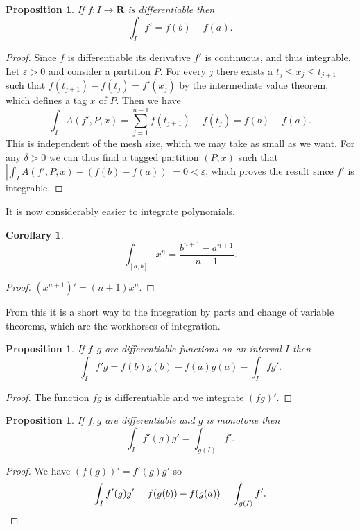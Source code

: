 \documentclass[11pt]{amsart}
\newtheorem{prop}[theo]{Proposition}
\newtheorem{coro}[theo]{Corollary}
\theoremstyle{definition}
\def\eps{\varepsilon}
\def\RR{\mathbf{R}}
\begin{document}
\begin{prop}
If $f : I \to \RR$ is differentiable then
\[
\int_I f' = f(b) - f(a).
\]
\end{prop}


\begin{proof}
Since $f$ is differentiable its derivative $f'$ is continuous, and thus integrable.
Let $\eps > 0$ and consider a partition $P$.
For every $j$ there exists a $t_j \leq x_j \leq t_{j+1}$ such that $f(t_{j+1}) - f(t_j) = f'(x_j)$ by the intermediate value theorem, which defines a tag $x$ of $P$.
Then we have
\[
\int_I A(f', P, x)
= \sum_{j=1}^{n-1} f(t_{j+1}) - f(t_j)
= f(b) - f(a).
\]
This is independent of the mesh size, which we may take as small as we want.
For any $\delta > 0$ we can thus find a tagged partition $(P,x)$ such that $|\int_I A(f',P,x) - (f(b) - f(a))| = 0 < \eps$, which proves the result since $f'$ is integrable.
\end{proof}


It is now considerably easier to integrate polynomials.

\begin{coro}
\[
\int_{[a,b]} x^n = \frac{b^{n+1} - a^{n+1}}{n+1}.
\]
\end{coro}

\begin{proof}
$(x^{n+1})' = (n+1) x^n$.
\end{proof}



From this it is a short way to the integration by parts and change of variable theorems, which are the workhorses of integration.


\begin{prop}
If $f,g$ are differentiable functions on an interval $I$ then
\[
\int_I f' g = f(b)g(b) - f(a)g(a) - \int_I f g'.
\]
\end{prop}

\begin{proof}
The function $fg$ is differentiable and we integrate $(fg)'$.
\end{proof}


\begin{prop}
If $f,g$ are differentiable and $g$ is monotone then
\[
\int_I f'(g) g' = \int_{g(I)} f'.
\]
\end{prop}

\begin{proof}
We have $(f(g))' = f'(g) g'$ so
\[
\int_I f'(g) g'
= f(g(b)) - f(g(a))
= \int_{g(I)} f'.
\qedhere
\]
\end{proof}
\end{document}
